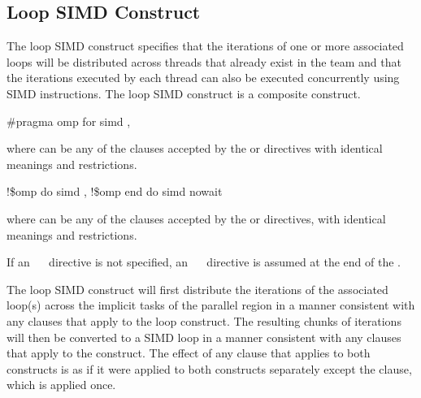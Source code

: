 \begin{samepage}
\subsection{Loop SIMD Construct}
\label{subsec:Loop SIMD Construct}
\summary
The loop SIMD construct specifies that the iterations of one or more associated loops will be distributed across threads that already exist in the team and that the iterations executed by each thread can also be executed concurrently using SIMD instructions. The loop SIMD construct is a composite construct.
\end{samepage}

\begin{samepage}
\syntax
\ccppspecificstart
\begin{boxedcode}
\#pragma omp for simd \plc{[clause[ [},\plc{] clause] ... ] new-line}
\end{boxedcode}
\end{samepage}

where  can be any of the clauses accepted by the  or  directives with 
identical meanings and restrictions.
\ccppspecificend

\fortranspecificstart
\begin{boxedcode}
!\$omp do simd \plc{[clause[ [},\plc{] clause] ... ]}
\plc{[}!\$omp end do simd \plc{[}nowait\plc{] ]}
\end{boxedcode}

where  can be any of the clauses accepted by the  or  directives, with 
identical meanings and restrictions.

If an ~~ directive is not specified, an ~~ directive is 
assumed at the end of the .
\fortranspecificend

\descr
The loop SIMD construct will first distribute the iterations of the associated loop(s) 
across the implicit tasks of the parallel region in a manner consistent with any clauses 
that apply to the loop construct. The resulting chunks of iterations will then be converted 
to a SIMD loop in a manner consistent with any clauses that apply to the  
construct. The effect of any clause that applies to both constructs is as if it were applied to both constructs separately except the  clause, which is applied once.

